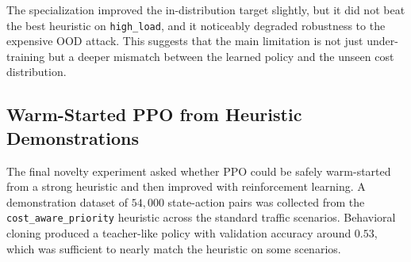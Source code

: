 \documentclass[conference]{IEEEtran}
\begin{document}
\begin{table}[H]
\centering
\caption{High-load fine-tuning of the cost-aware PPO. The specialized agent improves slightly on the target scenario but still does not surpass the strongest heuristics, and it hurts OOD performance on \texttt{expensive\_attack}.}
\label{tab:finetune}
\end{table}

The specialization improved the in-distribution target slightly, but it did not beat the best heuristic on \texttt{high\_load}, and it noticeably degraded robustness to the expensive OOD attack. This suggests that the main limitation is not just under-training but a deeper mismatch between the learned policy and the unseen cost distribution.

\subsection{Warm-Started PPO from Heuristic Demonstrations}
The final novelty experiment asked whether PPO could be safely warm-started from a strong heuristic and then improved with reinforcement learning. A demonstration dataset of $54{,}000$ state-action pairs was collected from the \texttt{cost\_aware\_priority} heuristic across the standard traffic scenarios. Behavioral cloning produced a teacher-like policy with validation accuracy around $0.53$, which was sufficient to nearly match the heuristic on some scenarios.
\end{document}
